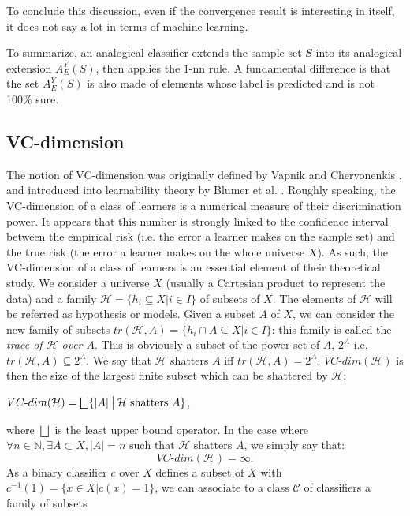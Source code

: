 {\begin{enumerate}
\end{enumerate}
To conclude this discussion, even if the convergence result is interesting in
itself, it does not say a lot in terms of machine learning.

To summarize, an analogical classifier extends the sample set $S$ into its
analogical extension $A_E^Y(S)$, then applies the $1\mbox{-nn}$ rule. A
fundamental difference is that the set $A_E^Y(S)$ is also made of elements
whose label is predicted and is not 100\% sure.

\subsection{VC-dimension}\label{vcdim}
The notion of VC-dimension was originally defined by Vapnik and Chervonenkis
\cite{Vap98}, and introduced into learnability theory by Blumer et al.
\cite{BluEhrHauWarACM89}. Roughly speaking, the VC-dimension of a class of learners is a numerical measure of their discrimination power. It appears that this number is strongly linked to the confidence interval between the empirical risk (i.e. the error a learner makes on the sample set) and the true risk (the error a learner makes on the whole universe $X$). As such, the VC-dimension of a class of learners is an essential element of their theoretical study.
We consider a universe $X$ (usually a Cartesian product to represent the data) and a
family $\mathcal{H}=\{h_i \subseteq X|i \in I\}$ of subsets of $X$.
The elements of $\mathcal{H}$ will be referred as hypothesis or models.
Given a subset $A$
of $X$, we can consider the new family of subsets $tr(\mathcal{H},A) = \{h_i \cap A \subseteq X|i \in I\}$: this family is called the {\it trace of $\mathcal{H}$ over $A$}. This is obviously a subset
of the power set of $A$, $2^A$ i.e. $tr(\mathcal{H},A) \subseteq 2^A$.
We say that $\mathcal{H}$ shatters $A$ iff $tr(\mathcal{H},A)=2^A$.
$VC\mbox{-}dim(\mathcal{H})$ is then the size of the largest finite subset which can be shattered by $\mathcal{H}$:
\begin{definition}
  $VC\mbox{-}dim(\mathcal{H}) = \bigsqcup \{|A| \given[\big] \mathcal{H} \mbox{ shatters } A
\}$,
\end{definition}
where $\bigsqcup$ is the least upper bound operator.
In the case where $\forall n \in\mathbb{N}, \exists  A \subset X, |A|=n \mbox{ such
that } \mathcal{H} \mbox{ shatters } A$, we simply say that:
$$VC\mbox{-}dim(\mathcal{H})=\infty.$$
\noindent
As a binary classifier $c$ over $X$ defines a subset of $X$ with $c^{-1}(1)=\{x \in X | c(x)=1\}$, we can associate to a class $\mathcal{C}$ of classifiers a family of subsets
}
